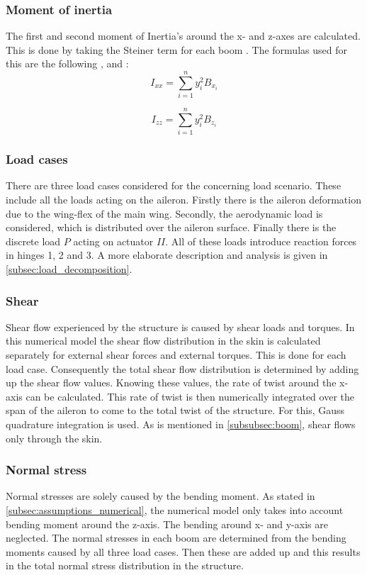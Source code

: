 \subsubsection{Moment of inertia}
\label{subsubsec:MoI}
The first and second moment of Inertia's around the x- and z-axes are calculated. This is done by taking the Steiner term for each boom \cite{the_book}. The formulas used for this are the following ,  and :
\begin{equation}
\label{MoI_xx}
    I_{x x}=\sum_{i=1}^{n} y_{i}^{2} B_{x_{i}}
\end{equation}

\begin{equation}
\label{MoI_zz}
    I_{z z}=\sum_{i=1}^{n} y_{i}^{2} B_{z_{i}}
\end{equation}

\subsubsection{Load cases}

There are three load cases considered for the concerning load scenario. These include all the loads acting on the aileron.
Firstly there is the aileron deformation due to the wing-flex of the main wing. Secondly, the aerodynamic load is considered, which is distributed over the aileron surface. Finally there is the discrete load $P$ acting on actuator $II$. All of these loads introduce reaction forces in hinges 1, 2 and 3. A more elaborate description and analysis is given in \autoref{subsec:load_decomposition}.

\subsubsection{Shear}
Shear flow experienced by the structure is caused by shear loads and torques. In this numerical model the shear flow distribution in the skin is calculated separately for external shear forces and external torques. This is done for each load case. Consequently the total shear flow distribution is determined by adding up the shear flow values. Knowing these values, the rate of twist around the x-axis can be calculated. This rate of twist is then numerically integrated over the span of the aileron to come to the total twist of the structure. For this, Gauss quadrature integration is used.
As is mentioned in \autoref{subsubsec:boom}, shear flows only through the skin.

\subsubsection{Normal stress}
Normal stresses are solely caused by the bending moment. As stated in \autoref{subsec:assumptions_numerical}, the numerical model only takes into account bending moment around the z-axis. The bending around x- and y-axis are neglected.
The normal stresses in each boom are determined from the bending moments caused by all three load cases. Then these are added up and this results in the total normal stress distribution in the structure.

